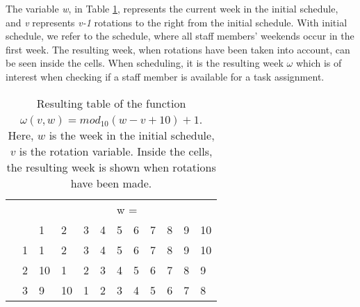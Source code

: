 The variable \textit{w}, in Table \ref{tab:mod}, represents the current week in the initial schedule, and \textit{v} represents \textit{v-1} rotations to the right from the initial schedule. With initial schedule, we refer to the schedule, where all staff members' weekends occur in the first week. The resulting week, when rotations have been taken into account, can be seen inside the cells. When scheduling, it is the resulting week $\omega$ which is of interest when checking if a staff member is available for a task assignment. 
\begin{table}[H]
\centering
\caption{Resulting table of the function $\omega(v,w) = mod_{10}(w-v+10)+1$. Here, $w$ is the week in the initial schedule, $v$ is the rotation variable. Inside the cells, the resulting week is shown when rotations have been made.}
\label{tab:mod}
\begin{tabular}{llllllllllll}
    &                         &                         &                         &                         &                         & \multicolumn{2}{l}{w =}                           &                         &                         &                         &                         \\
    &                         & 1                       & 2                       & 3                       & 4                       & 5                       & 6                       & 7                       & 8                       & 9                       & 10                      \\ \cline{3-12} 
    & \multicolumn{1}{l|}{1}  & \multicolumn{1}{l|}{1}  & \multicolumn{1}{l|}{2}  & \multicolumn{1}{l|}{3}  & \multicolumn{1}{l|}{4}  & \multicolumn{1}{l|}{5}  & \multicolumn{1}{l|}{6}  & \multicolumn{1}{l|}{7}  & \multicolumn{1}{l|}{8}  & \multicolumn{1}{l|}{9}  & \multicolumn{1}{l|}{10} \\ \cline{3-12} 
    & \multicolumn{1}{l|}{2}  & \multicolumn{1}{l|}{10} & \multicolumn{1}{l|}{1}  & \multicolumn{1}{l|}{2}  & \multicolumn{1}{l|}{3}  & \multicolumn{1}{l|}{4}  & \multicolumn{1}{l|}{5}  & \multicolumn{1}{l|}{6}  & \multicolumn{1}{l|}{7}  & \multicolumn{1}{l|}{8}  & \multicolumn{1}{l|}{9}  \\ \cline{3-12} 
    & \multicolumn{1}{l|}{3}  & \multicolumn{1}{l|}{9}  & \multicolumn{1}{l|}{10} & \multicolumn{1}{l|}{1}  & \multicolumn{1}{l|}{2}  & \multicolumn{1}{l|}{3}  & \multicolumn{1}{l|}{4}  & \multicolumn{1}{l|}{5}  & \multicolumn{1}{l|}{6}  & \multicolumn{1}{l|}{7}  & \multicolumn{1}{l|}{8}  \\ \cline{3-12} 

\end{tabular}
\end{table}
